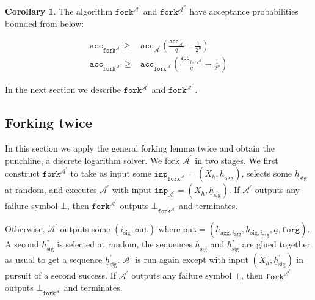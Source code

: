 \documentclass{mrl}
\theoremstyle{definition}
\numberwithin{theorem}{subsection}
\newtheorem{cor}[theorem]{Corollary}
\newcommand{\adversary}{\mathcal{A}}
\begin{document}
\begin{cor}
The algorithm $\texttt{fork}^{\adversary^\prime}$ and  $\texttt{fork}^{\adversary^{\prime \prime}}$ have acceptance probabilities bounded from below:

\begin{align*}
\texttt{acc}_{\texttt{fork}^{\adversary^\prime}} \geq& \texttt{acc}_{\adversary^\prime} \left(\frac{\texttt{acc}_{\adversary^\prime}}{q} - \frac{1}{2^\eta}\right) \\
\texttt{acc}_{\texttt{fork}^{\adversary^{\prime \prime}}} \geq& \texttt{acc}_{\texttt{fork}^{\adversary^\prime}} \left(\frac{\texttt{acc}_{\texttt{fork}^{\adversary^\prime}}}{q} - \frac{1}{2^\eta}\right)
\end{align*}
\end{cor} In the next section we describe $\texttt{fork}^{\adversary^\prime}$ and $\texttt{fork}^{\adversary^{\prime \prime}}$.

\subsection{Forking twice}\label{forkingTwice}

In this section we apply the general forking lemma twice and obtain the punchline, a discrete logarithm solver. We fork $\adversary^\prime$ in two stages. We first construct $\texttt{fork}^{\adversary^\prime}$ to take as input some $\texttt{inp}_{\texttt{fork}^{\adversary^\prime}} = (X_h, \underline{h}_{\text{agg}})$,  selects some $\underline{h}_{\text{sig}}$ at random, and executes $\adversary^\prime$ with input $\texttt{inp}_{\adversary^\prime} = (X_h, \underline{h}_{\text{sig}})$. If $\adversary^\prime$ outputs any failure symbol $\bot$, then $\texttt{fork}^{\adversary^\prime}$ outputs $\bot_{\texttt{fork}^{\adversary^\prime}}$ and terminates.

Otherwise, $\adversary^\prime$ outputs some $(i_{\text{sig}}, \texttt{out})$ where $\texttt{out} = (h_{\text{agg}, i_{\texttt{agg}}}, h_{\text{sig}, i_{\texttt{sig}}}, \underline{a}, \texttt{forg})$. A second $\underline{h}_{\text{sig}}^*$ is selected at random, the sequences $\underline{h}_{\text{sig}}$ and $\underline{h}_{\text{sig}}^*$ are glued together as usual to get a sequence $\underline{h}_{\text{sig}}^\prime$. $\adversary^\prime$ is run again except with input $(X_h, \underline{h}_{\text{sig}}^\prime)$ in pursuit of a second success.  If $\adversary^\prime$ outputs any failure symbol $\bot$, then $\texttt{fork}^{\adversary^\prime}$ outputs $\bot_{\texttt{fork}^{\adversary^\prime}}$ and terminates.
\end{document}
